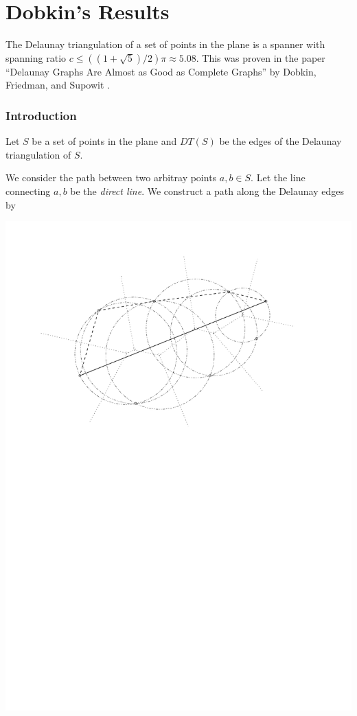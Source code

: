 \documentclass{tufte-handout}
\title{\DocTitle}
\author{\DocAuthor}
\begin{document}
\maketitle


\part{Dobkin's Results}

The Delaunay triangulation of a set of points in the plane is a
spanner with spanning ratio $c \le ((1 + \sqrt{5})/2)\pi \approx
5.08$.  This was proven in the paper ``Delaunay Graphs Are Almost as
Good as Complete Graphs'' by Dobkin, Friedman, and Supowit
\cite{Dobkin:1987} \cite{Dobkin:1990}.

\section{Introduction}

Let $S$ be a set of points in the plane and $DT(S)$ be the edges of
the Delaunay triangulation of $S$.

We consider the path between two arbitray points $a,b \in S$.  Let the
line connecting $a,b$ be the \emph{direct line}.  We construct a path
along the Delaunay edges by

\includegraphics[scale=0.75]{figures/voronoi.pdf}
\end{document}
